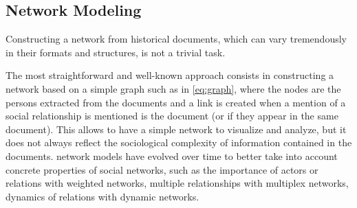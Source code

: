 

\subsection{Network Modeling}\label{subsec:network-modeling}

Constructing a network from historical documents, which can vary tremendously in their formats and structures, is not a trivial task\cite{alkadi2022}.

The most straightforward and well-known approach consists in constructing a network based on a simple graph such as in \autoref{eq:graph}, where the nodes are the persons extracted from the documents and a link is created when a mention of a social relationship is mentioned is the document (or if they appear in the same document)\cite{lemercier12FormalNetwork2015, bouletBatchKernelSOM2008}.
This allows to have a simple network to visualize and analyze, but it does not always reflect the sociological complexity of information contained in the documents.
\hsna network models have evolved over time to better take into account concrete properties of social networks, such as the importance of actors or relations with weighted networks, multiple relationships with multiplex networks, dynamics of relations with dynamic networks.

